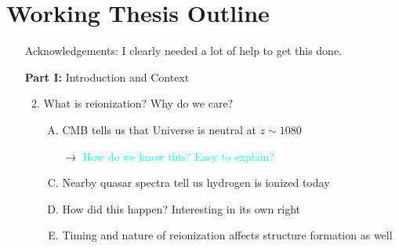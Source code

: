 \documentclass[11pt]{article}
\begin{document}
\section*{Working Thesis Outline}

\begin{enumerate}
\item [{Acknowledgements:}] I clearly needed a lot of help to get this done.
\item [{\bf Part I:}] Introduction and Context
\begin{enumerate}[1.]
\item[]
\item What is reionization? Why do we care?
\begin{enumerate}[A.]
\item CMB tells us that Universe is neutral at $z \sim 1080$
\item [$\to$] \textcolor{cyan}{How do we know this? Easy to explain?}
\item Nearby quasar spectra tell us hydrogen is ionized today
\item How did this happen? Interesting in its own right
\item Timing and nature of reionization affects structure formation as well
\end{enumerate}



\end{enumerate}
\end{enumerate}
\end{document}
